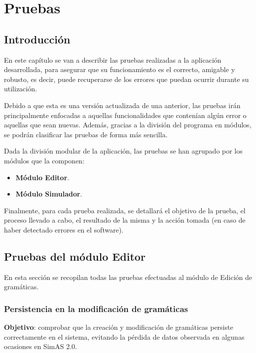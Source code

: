 \chapter{Pruebas}\label{cap:pruebas}

\section{Introducción}

En este capítulo se van a describir las pruebas realizadas a la aplicación desarrollada, para asegurar que su funcionamiento es el correcto, amigable y robusto, es decir, puede recuperarse de los errores que puedan ocurrir durante su utilización.

Debido a que esta es una versión actualizada de una anterior, las pruebas irán principalmente enfocadas a aquellas funcionalidades que contenían algún error o aquellas que sean nuevas. Además, gracias a la división del programa en módulos, se podrán clasificar las pruebas de forma más sencilla.

Dada la división modular de la aplicación, las pruebas se han agrupado por los módulos que la componen:

\begin{itemize}
  \item \textbf{Módulo Editor}.
  \item \textbf{Módulo Simulador}.
\end{itemize}

Finalmente, para cada prueba realizada, se detallará el objetivo de la prueba, el proceso llevado a cabo, el resultado de la misma y la acción tomada (en caso de haber detectado e\-rrores en el software).

\section{Pruebas del módulo Editor}

En esta sección se recopilan todas las pruebas efectuadas al módulo de Edición de gramáticas.


\subsection{Persistencia en la modificación de gramáticas}

\textbf{Objetivo}: comprobar que la creación y modificación de gramáticas persiste correctamente en el sistema, evitando la pérdida de datos observada en algunas ocasiones en SimAS 2.0.
\medskip

